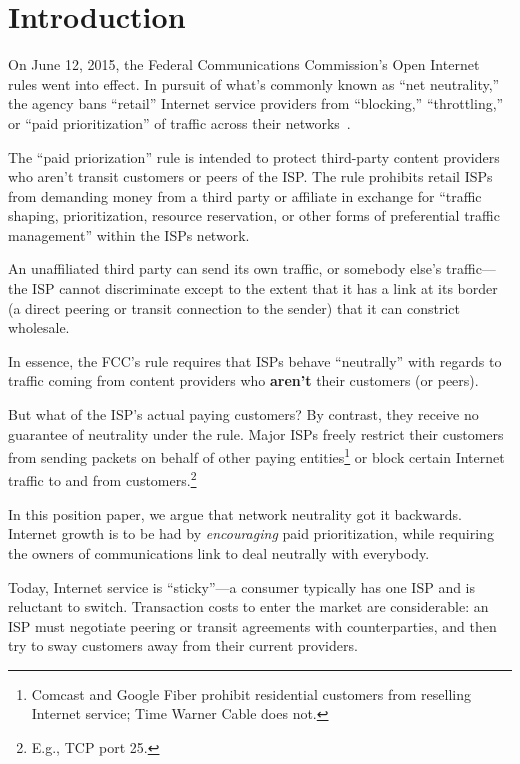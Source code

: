 \section{Introduction}

\label{sec:intro}

On June 12, 2015, the Federal Communications Commission's Open
Internet rules went into effect. In pursuit of what's commonly known
as ``net neutrality,'' the agency bans ``retail'' Internet service
providers from ``blocking,'' ``throttling,'' or ``paid
prioritization'' of traffic across their networks~\cite{openinternet}.

The ``paid priorization'' rule is intended to protect third-party
content providers who aren't transit customers or peers of the
ISP. The rule prohibits retail ISPs from demanding money from a third
party or affiliate in exchange for ``traffic shaping, prioritization,
resource reservation, or other forms of preferential traffic
management'' within the ISPs network.

An unaffiliated third party can send its own traffic, or somebody
else's traffic---the ISP cannot discriminate except to the extent that
it has a link at its border (a direct peering or transit connection to
the sender) that it can constrict wholesale.

In essence, the FCC's rule requires that ISPs behave ``neutrally''
with regards to traffic coming from content providers who
\textbf{aren't} their customers (or peers).

But what of the ISP's actual paying customers? By contrast, they
receive no guarantee of neutrality under the rule. Major ISPs freely
restrict their customers from sending packets on behalf of other
paying entities\footnote{Comcast and Google Fiber prohibit residential
  customers from reselling Internet service; Time Warner Cable does
  not.} or block certain Internet traffic to and from
customers.\footnote{E.g., TCP port 25.}

In this position paper, we argue that network neutrality got it
backwards. Internet growth is to be had by \emph{encouraging} paid
prioritization, while requiring the owners of communications link to
deal neutrally with everybody.

Today, Internet service is ``sticky''---a consumer typically has one
ISP and is reluctant to switch. Transaction costs to enter the market
are considerable: an ISP must negotiate peering or transit agreements
with counterparties, and then try to sway customers away from
their current providers.

